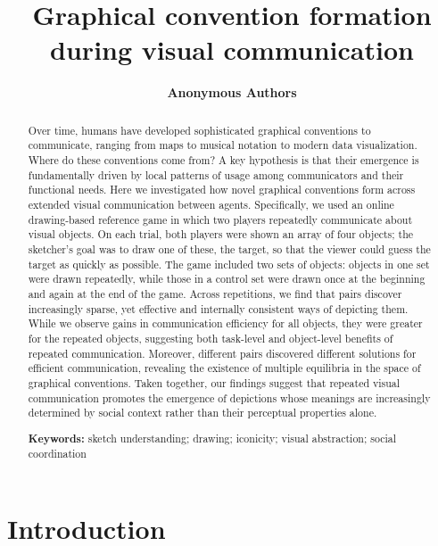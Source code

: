\documentclass[10pt,letterpaper]{article}
\title{Graphical convention formation during visual communication}
\author{\large \bf Anonymous Authors}
\begin{document}
\maketitle

\begin{abstract}
Over time, humans have developed sophisticated graphical conventions to communicate, ranging from maps to musical notation to modern data visualization. Where do these conventions come from? A key hypothesis is that their emergence is fundamentally driven by local patterns of usage among communicators and their functional needs. Here we investigated how novel graphical conventions form across extended visual communication between agents. Specifically, we used an online drawing-based reference game in which two players repeatedly communicate about visual objects. On each trial, both players were shown an array of four objects; the sketcher’s goal was to draw one of these, the target, so that the viewer could guess the target as quickly as possible. The game included two sets of objects: objects in one set were drawn repeatedly, while those in a control set were drawn once at the beginning and again at the end of the game. Across repetitions, we find that pairs discover increasingly sparse, yet effective and internally consistent ways of depicting them. While we observe gains in communication efficiency for all objects, they were greater for the repeated objects, suggesting both task-level and object-level benefits of repeated communication. Moreover, different pairs discovered different solutions for efficient communication, revealing the existence of multiple equilibria in the space of graphical conventions. Taken together, our findings suggest that repeated visual communication promotes the emergence of depictions whose meanings are increasingly determined by social context rather than their perceptual properties alone.

\textbf{Keywords:}
sketch understanding; drawing; iconicity; visual abstraction; social coordination

\end{abstract}

\section{Introduction}
\end{document}
